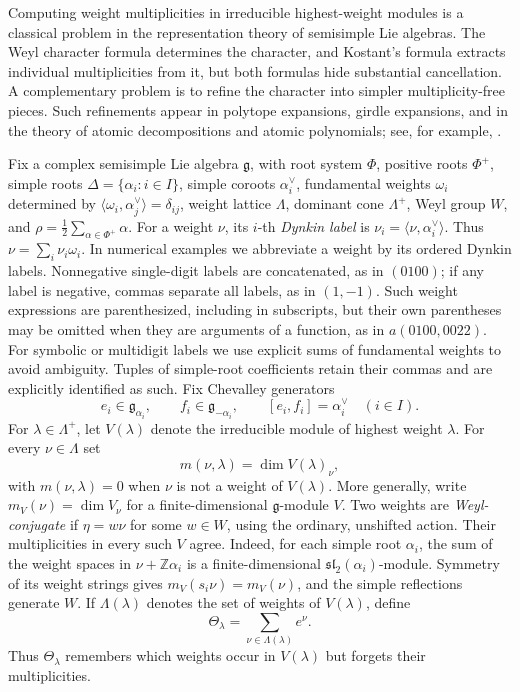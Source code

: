 \documentclass[11pt]{article}
\theoremstyle{definition}
\theoremstyle{remark}
\newcommand{\Raiz}{\Phi}
\newcommand{\RaizSimp}{\Delta}
\newcommand{\Pesos}{\Lambda}
\newcommand{\Weyl}{W}
\newcommand{\Z}{\mathbb Z}
\begin{document}
Computing weight multiplicities in irreducible highest-weight modules is a
classical problem in the representation theory of semisimple Lie algebras.
The Weyl character formula determines the character, and Kostant's formula
extracts individual multiplicities from it, but both formulas hide substantial
cancellation.  A complementary problem is to refine the character into simpler
multiplicity-free pieces.  Such refinements appear in polytope expansions,
girdle expansions, and in the theory of atomic decompositions and atomic
polynomials; see, for example, \cite{Walton2,Schutzer,Shimozono,MR4178925,Patimo}.

Fix a complex semisimple Lie algebra $\mathfrak g$, with root system $\Raiz$,
positive roots $\Raiz^+$, simple roots
$\RaizSimp=\{\alpha_i:i\in I\}$, simple coroots $\alpha_i^\vee$,
fundamental weights $\omega_i$ determined by
$\langle\omega_i,\alpha_j^\vee\rangle=\delta_{ij}$, weight lattice $\Pesos$,
dominant cone $\Pesos^+$, Weyl group $\Weyl$, and
$\rho=\frac12\sum_{\alpha\in\Raiz^+}\alpha$.  For a weight $\nu$, its
$i$-th \emph{Dynkin label} is $\nu_i=\langle\nu,\alpha_i^\vee\rangle$.
Thus $\nu=\sum_i\nu_i\omega_i$.  In numerical examples we abbreviate a
weight by its ordered Dynkin labels.  Nonnegative single-digit labels are
concatenated, as in $(0100)$; if any label is negative, commas separate all
labels, as in $(1,-1)$.  Such weight expressions are parenthesized, including
in subscripts, but their own parentheses may be omitted when they are
arguments of a function, as in $a(0100,0022)$.  For symbolic or multidigit
labels we use explicit sums of fundamental weights to avoid ambiguity.
Tuples of simple-root coefficients retain their commas and are explicitly
identified as such.
Fix Chevalley generators
\[
 e_i\in\mathfrak g_{\alpha_i},\qquad
 f_i\in\mathfrak g_{-\alpha_i},\qquad
 [e_i,f_i]=\alpha_i^\vee
 \quad(i\in I).
\]
For $\lambda\in\Pesos^+$, let $V(\lambda)$ denote the irreducible module of
highest weight $\lambda$.  For every $\nu\in\Pesos$ set
\[
 m(\nu,\lambda)=\dim V(\lambda)_\nu,
\]
with $m(\nu,\lambda)=0$ when $\nu$ is not a weight of $V(\lambda)$.
More generally, write $m_V(\nu)=\dim V_\nu$ for a finite-dimensional
$\mathfrak g$-module $V$.  Two weights are \emph{Weyl-conjugate} if
$\eta=w\nu$ for some $w\in\Weyl$, using the ordinary, unshifted action.
Their multiplicities in every such $V$ agree.  Indeed, for each simple root
$\alpha_i$, the sum of the weight spaces in $\nu+\Z\alpha_i$ is a
finite-dimensional $\mathfrak{sl}_2(\alpha_i)$-module.  Symmetry of its
weight strings gives $m_V(s_i\nu)=m_V(\nu)$, and the simple reflections
generate $\Weyl$.  If
$\Pesos(\lambda)$ denotes the set of weights of $V(\lambda)$, define
\[
    \Theta_\lambda=\sum_{\nu\in\Pesos(\lambda)} e^\nu.
\]
Thus $\Theta_\lambda$ remembers which weights occur in $V(\lambda)$ but forgets
their multiplicities.
\end{document}
